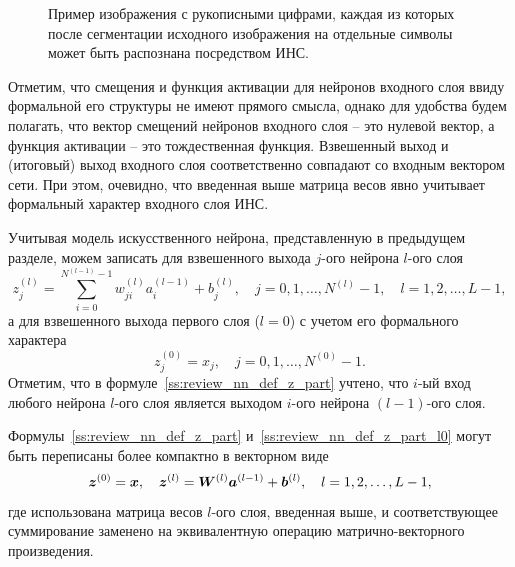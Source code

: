 \documentclass[a4paper,12pt,russian]{article} %
\begin{document}
\begin{figure}[t!]
	\caption{
		Пример изображения с рукописными цифрами, каждая из которых после сегментации исходного изображения на отдельные символы может быть распознана посредством ИНС.
        }
        \label{fig:nn_digits}
\end{figure}

Отметим, что смещения и функция активации для нейронов входного слоя ввиду формальной его структуры не имеют прямого смысла, однако для удобства будем полагать, что вектор смещений нейронов входного слоя -- это нулевой вектор, а функция активации -- это тождественная функция.
Взвешенный выход и (итоговый) выход входного слоя соответственно совпадают со входным вектором сети.
При этом, очевидно, что введенная выше матрица весов явно учитывает формальный характер входного слоя ИНС.

Учитывая модель искусственного нейрона, представленную в предыдущем разделе, можем записать для взвешенного выхода $j$-ого нейрона $l$-ого слоя
\begin{equation} \label{ss:review_nn_def_z_part}
	z_j^{(l)} = \sum_{i=0}^{N^{(l-1)}-1} w_{ji}^{(l)} a_i^{(l-1)} + b_j^{(l)}, \quad
	j = 0, 1, \ldots, N^{(l)}-1, \quad
	l = 1, 2, \ldots, L-1,
\end{equation}
а для взвешенного выхода первого слоя ($l=0$) с учетом его формального характера
\begin{equation} \label{ss:review_nn_def_z_part_l0}
	z_j^{(0)} = x_j, \quad
	j = 0, 1, \ldots, N^{(0)}-1.
\end{equation}
Отметим, что в формуле~\eqref{ss:review_nn_def_z_part} учтено, что $i$-ый вход любого нейрона $l$-ого слоя является выходом $i$-ого нейрона  $(l-1)$-ого слоя.

Формулы~\eqref{ss:review_nn_def_z_part} и~\eqref{ss:review_nn_def_z_part_l0} могут быть переписаны более компактно в векторном виде
\begin{equation} \label{ss:review_nn_def_z}
	\bm{z}^{(0)} = \bm{x}, \quad
	\bm{z}^{(l)} = \bm{W}^{(l)} \bm{a}^{(l-1)} + \bm{b}^{(l)}, \quad
	l = 1, 2, \ldots, L-1,
\end{equation}
где использована матрица весов $l$-ого слоя, введенная выше, и соответствующее суммирование заменено на эквивалентную операцию матрично-векторного произведения.
\end{document}

